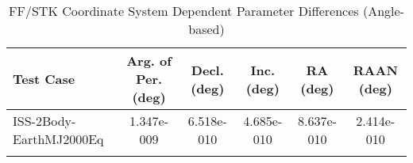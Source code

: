 \begin{table}[htbp!]
\centering
\caption{ FF/STK Coordinate System Dependent Parameter Differences (Angle-based)}
      \begin{tabular}{lccccc}
      \hline\hline
          Test Case & Arg. of Per. (deg) & Decl. (deg) & Inc. (deg) & RA (deg) & RAAN (deg) \\
         \hline
         ISS-2Body-EarthMJ2000Eq & 1.347e-009 & 6.518e-010 & 4.685e-010 & 8.637e-010 & 2.414e-010 \\
      \hline\hline
      \label{Table: FF-STK CS Parameters Set 5} 
\end{tabular}
\end{table}
